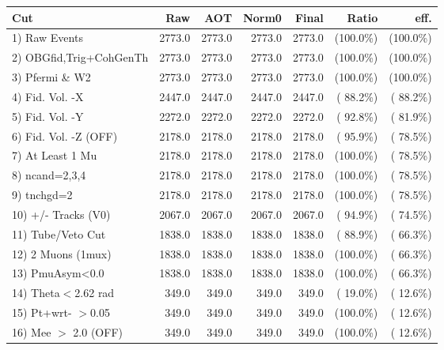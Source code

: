  \begin{table}[h!]\centering
 \begin{tabular}{||l||r|r|r|r|r|r||}
 \hline
 \hline
 Cut & Raw & AOT & Norm0 & Final & Ratio & eff.       \\
 \hline
  1) Raw Events           &       2773.0 &       2773.0 &       2773.0 &       2773.0 & (100.0\%) & (100.0\%) \\
  2) OBGfid,Trig+CohGenTh &       2773.0 &       2773.0 &       2773.0 &       2773.0 & (100.0\%) & (100.0\%) \\
  3) Pfermi \& W2         &       2773.0 &       2773.0 &       2773.0 &       2773.0 & (100.0\%) & (100.0\%) \\
  4) Fid. Vol. -X         &       2447.0 &       2447.0 &       2447.0 &       2447.0 & ( 88.2\%) & ( 88.2\%) \\
  5) Fid. Vol. -Y         &       2272.0 &       2272.0 &       2272.0 &       2272.0 & ( 92.8\%) & ( 81.9\%) \\
  6) Fid. Vol. -Z (OFF)   &       2178.0 &       2178.0 &       2178.0 &       2178.0 & ( 95.9\%) & ( 78.5\%) \\
  7) At Least 1 Mu        &       2178.0 &       2178.0 &       2178.0 &       2178.0 & (100.0\%) & ( 78.5\%) \\
  8) ncand=2,3,4          &       2178.0 &       2178.0 &       2178.0 &       2178.0 & (100.0\%) & ( 78.5\%) \\
  9) tnchgd=2             &       2178.0 &       2178.0 &       2178.0 &       2178.0 & (100.0\%) & ( 78.5\%) \\
 10) +/- Tracks (V0)      &       2067.0 &       2067.0 &       2067.0 &       2067.0 & ( 94.9\%) & ( 74.5\%) \\
 11) Tube/Veto Cut        &       1838.0 &       1838.0 &       1838.0 &       1838.0 & ( 88.9\%) & ( 66.3\%) \\
 12) 2 Muons (1mux)       &       1838.0 &       1838.0 &       1838.0 &       1838.0 & (100.0\%) & ( 66.3\%) \\
 13) PmuAsym<0.0          &       1838.0 &       1838.0 &       1838.0 &       1838.0 & (100.0\%) & ( 66.3\%) \\
 14) Theta$<$2.62 rad     &        349.0 &        349.0 &        349.0 &        349.0 & ( 19.0\%) & ( 12.6\%) \\
 15) Pt+wrt- $>$0.05      &        349.0 &        349.0 &        349.0 &        349.0 & (100.0\%) & ( 12.6\%) \\
 16) Mee $>$ 2.0  (OFF)   &        349.0 &        349.0 &        349.0 &        349.0 & (100.0\%) & ( 12.6\%) \\

\end{tabular}
\end{table}
